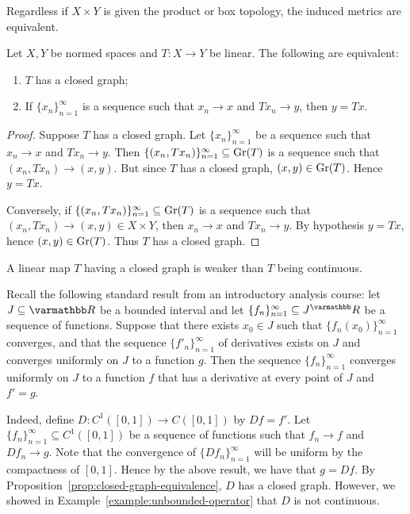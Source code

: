 \begin{remark}
    Regardless if $X \times Y$ is given the product or box topology, the induced metrics are equivalent.
\end{remark}

\begin{proposition}\label{prop:closed-graph-equivalence}
    Let $X,Y$ be normed spaces and $T:X \rightarrow Y$ be linear. The following are equivalent:
        \begin{enumerate}[label = (\arabic*),itemsep=1pt,topsep=3pt]
            \item $T$ has a closed graph;
            \item If $\{x_n\}_{n = 1}^\infty$ is a sequence such that $x_n \rightarrow x$ and $T x_n \rightarrow y$, then $y = Tx$.
        \end{enumerate}
\end{proposition}
    \begin{proof}
        Suppose $T$ has a closed graph. Let $\{x_n\}_{n = 1}^\infty$ be a sequence such that $x_n \rightarrow x$ and $T x_n \rightarrow y$. Then $\{(x_n,T x_n)\}_{n = 1}^\infty \subseteq \operatorname{Gr}(T)$ is a sequence such that $(x_n, T x_n) \rightarrow (x,y)$. But since $T$ has a closed graph, $(x,y) \in \operatorname{Gr}(T)$. Hence $y= Tx$.

        Conversely, if $\{(x_n,Tx_n)\}_{n =1}^\infty \subseteq \operatorname{Gr}(T)$ is a sequence such that $(x_n, T x_n) \rightarrow (x,y) \in X \times Y$, then $x_n \rightarrow x$ and $T x_n \rightarrow y$. By hypothesis $y = Tx$, hence $(x,y) \in \operatorname{Gr}(T)$. Thus $T$ has a closed graph.
    \end{proof}

\begin{remark}
    A linear map $T$ having a closed graph is weaker than $T$ being continuous.
\end{remark}

\begin{example}
    Recall the following standard result from an introductory analysis course: let $J \subseteq \bfR$ be a bounded interval and let $\{f_n\}_{n = 1}^\infty \subseteq J^\bfR$ be a sequence of functions. Suppose that there exists $x_0 \in J$ such that $\{f_n(x_0)\}_{n = 1}^\infty$ converges, and that the sequence $\{f'_n\}_{n = 1}^\infty$ of derivatives exists on $J$ and converges uniformly on $J$ to a function $g$. Then the sequence $\{f_n\}_{n = 1}^\infty$ converges uniformly on $J$ to a function $f$ that has a derivative at every point of $J$ and $f' = g$.

    Indeed, define $D:C^1([0,1]) \rightarrow C([0,1])$ by $Df = f'$. Let $\{f_n\}_{n = 1}^\infty \subseteq C^1([0,1])$ be a sequence of functions such that $f_n \rightarrow f$ and $D f_n \rightarrow g$. Note that the convergence of $\{D f_n\}_{n = 1}^\infty$ will be uniform by the compactness of $[0,1]$. Hence by the above result, we have that $g = D f$. By Proposition~\ref{prop:closed-graph-equivalence}, $D$ has a closed graph. However, we showed in Example~\ref{example:unbounded-operator} that $D$ is not continuous.
\end{example}

